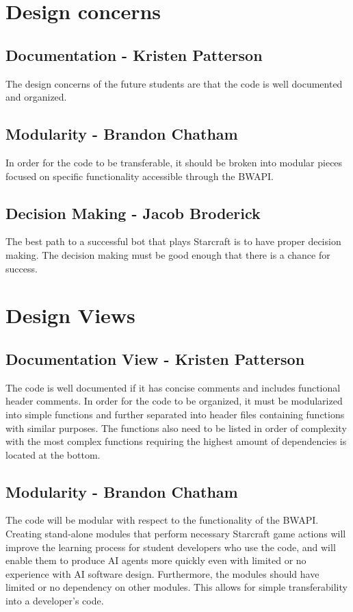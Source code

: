 \documentclass[10pt,letterpaper,onecolumn,draftclsnofoot]{IEEEtran}
\begin{document}
\section{Design concerns}
\subsection{Documentation - Kristen Patterson}
	The design concerns of the future students are that the code is well documented and organized. 
\subsection{Modularity - Brandon Chatham}
	In order for the code to be transferable, it should be broken into modular pieces focused on specific functionality accessible through the BWAPI.
\subsection{Decision Making - Jacob Broderick}
	The best path to a successful bot that plays Starcraft is to have proper decision making. The decision making must be good enough that there is a chance for success.
	
\section{Design Views}
\subsection{Documentation View - Kristen Patterson}
	The code is well documented if it has concise comments and includes functional header comments. In order for the code to be organized, it must be modularized into simple functions and further separated into header files containing functions with similar purposes. The functions also need to be listed in order of complexity with the most complex functions requiring the highest amount of dependencies is located at the bottom.
\subsection{Modularity - Brandon Chatham}
	The code will be modular with respect to the functionality of the BWAPI. Creating stand-alone modules that perform necessary Starcraft game actions will improve the learning process for student developers who use the code, and will enable them to produce AI agents more quickly even with limited or no experience with AI software design. Furthermore, the modules should have limited or no dependency on other modules. This allows for simple transferability into a developer's code. 
\end{document}
